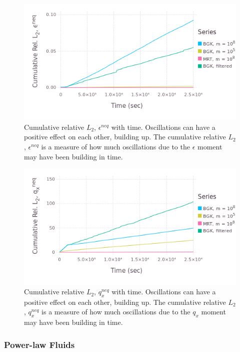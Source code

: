 \documentclass[pdftex,ms]{pittetd}
\begin{document}
\begin{figure}
    \includegraphics[width=\linewidth]{figs/poise-bingham/epsilon_cumulative}
    \caption{Cumulative relative $L_2$, $\epsilon^{neq}$ with time. Oscillations can have a positive effect on each other, building up. The cumulative relative $L_2$, $\epsilon^{neq}$ is a measure of how much oscillations due to the $\epsilon$ moment may have been building in time.}
    \label{fig:epsilon-cumulative}
\end{figure}

\begin{figure}
    \includegraphics[width=\linewidth]{figs/poise-bingham/qx_cumulative}
    \caption{Cumulative relative $L_2$, $q_x^{neq}$ with time. Oscillations can have a positive effect on each other, building up. The cumulative relative $L_2$, $q_x^{neq}$ is a measure of how much oscillations due to the $q_x$ moment may have been building in time.}
    \label{fig:qx-cumulative}
\end{figure}

\subsubsection{Power-law Fluids} \label{sec:poise-powerlaw}
\end{document}
